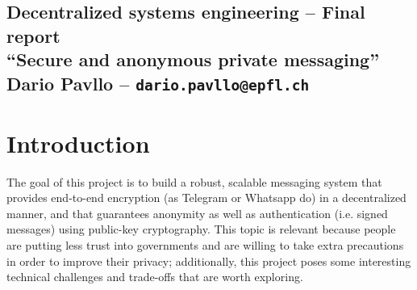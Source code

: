 \documentclass[a4paper,12pt]{article}
\title{}
\author{Dario Pavllo -- dario.pavllo@epfl.ch}
\date{} %
\begin{document}
{
\centering
\subsection*{Decentralized systems engineering -- Final report\\``Secure and anonymous private messaging''\\Dario Pavllo -- \texttt{dario.pavllo@epfl.ch}}}

\section{Introduction} %
The goal of this project is to build a robust, scalable messaging system that provides end-to-end encryption (as Telegram or Whatsapp do) in a decentralized manner, and that guarantees anonymity as well as authentication (i.e. signed messages) using public-key cryptography. This topic is relevant because people are putting less trust into governments and are willing to take extra precautions in order to improve their privacy; additionally, this project poses some interesting technical challenges and trade-offs that are worth exploring.
\end{document}
